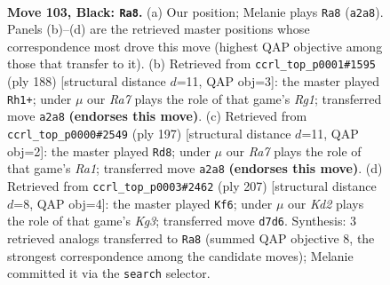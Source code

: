 \documentclass[11pt]{article}
\begin{document}
\clearpage

\begin{figure}[p]\centering
\begin{subfigure}{0.46\textwidth}\centering
\resizebox{\linewidth}{!}{%
\newchessgame
\chessboard[
  setfen={8/3k4/4p3/6R1/1R2P3/5P2/r7/5K2 b - - 10 103},
  showmover=false,
  pgfstyle=straightmove, color=movearrow, markmove={a2-a8}
]}
\caption{}
\end{subfigure}\hfill
\begin{subfigure}{0.46\textwidth}\centering
\resizebox{\linewidth}{!}{%
\newchessgame
\chessboard[
  setfen={8/8/r7/3P4/4K2k/8/p7/6R1 w - - 9 95},
  showmover=false,
  pgfstyle=straightmove, color=movearrow, markmove={g1-h1}
]}
\caption{}
\end{subfigure}
\\[4pt]
\begin{subfigure}{0.46\textwidth}\centering
\resizebox{\linewidth}{!}{%
\newchessgame
\chessboard[
  setfen={r7/3P4/8/2k5/2p5/8/1K6/3R4 b - - 17 99},
  showmover=false,
  pgfstyle=straightmove, color=movearrow, markmove={a8-d8}
]}
\caption{}
\end{subfigure}\hfill
\begin{subfigure}{0.46\textwidth}\centering
\resizebox{\linewidth}{!}{%
\newchessgame
\chessboard[
  setfen={8/8/6kp/R7/5P2/6PK/8/2r5 b - - 24 104},
  showmover=false,
  pgfstyle=straightmove, color=movearrow, markmove={g6-f6}
]}
\caption{}
\end{subfigure}
\caption{\textbf{Move 103, Black: \texttt{Ra8}.} (a) Our position; Melanie plays \texttt{Ra8} (\texttt{a2a8}). Panels (b)--(d) are the retrieved master positions whose correspondence most drove this move (highest QAP objective among those that transfer to it). (b) Retrieved from \texttt{ccrl\_top\_p0001\#1595} (ply 188) [structural distance $d$=11, QAP obj=3]: the master played \texttt{Rh1+}; under $\mu$ our \emph{Ra7} plays the role of that game's \emph{Rg1}; transferred move \texttt{a2a8} \textbf{(endorses this move)}. (c) Retrieved from \texttt{ccrl\_top\_p0000\#2549} (ply 197) [structural distance $d$=11, QAP obj=2]: the master played \texttt{Rd8}; under $\mu$ our \emph{Ra7} plays the role of that game's \emph{Ra1}; transferred move \texttt{a2a8} \textbf{(endorses this move)}. (d) Retrieved from \texttt{ccrl\_top\_p0003\#2462} (ply 207) [structural distance $d$=8, QAP obj=4]: the master played \texttt{Kf6}; under $\mu$ our \emph{Kd2} plays the role of that game's \emph{Kg3}; transferred move \texttt{d7d6}. Synthesis: 3 retrieved analogs transferred to \texttt{Ra8} (summed QAP objective 8, the strongest correspondence among the candidate moves); Melanie committed it via the \texttt{search} selector.}
\label{fig:thought-m205}
\end{figure}
\end{document}
